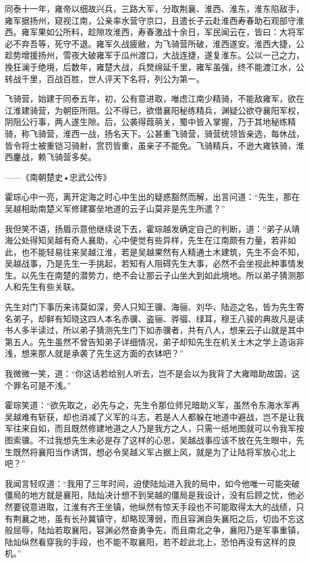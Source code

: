 同泰十一年，雍帝以细故兴兵，三路大军，分取荆襄、淮西、淮东，淮东陷敌手，雍军据扬州，窥视江南，公亲率水营守京口，且遣长子云赴淮西寿春助石观部守淮西。雍军果如公所料，趁隙攻淮西，寿春激战十余日，军民闻云在，皆曰：大将军必不弃吾等，死守不退。雍军久战疲敝，为飞骑营所破，淮西遂安。淮西大捷，公趁势增援扬州，雪夜大破雍军于瓜州渡口，大战连捷，遂复淮东。公以一己之力，挽狂澜于绝境，后数年，雍楚大战，兵燹绵延千里，雍军虽强，终不能渡江水，公转战千里，百战百胜，世人评天下名将，列公为第一。

飞骑营，始建于同泰五年，初，公有意进取，唯虑江南少精骑，不能敌雍军，欲在江淮建骑营，为朝臣所阻。公不得已，欲借襄阳秘练精兵，渊疑公欲夺襄阳军权，阴阻公行事，两人遂生隙。后，公袭得葭萌关，蜀中皆入掌握，乃于其地秘练精骑，称飞骑营，淮西一战，扬名天下。公甚重飞骑营，骑营统领皆亲选，每休战，皆令将士被重铠习骑射，赏罚皆重，虽亲子不能免。飞骑精兵，不逊大雍铁骑，淮西鏖战，赖飞骑营多矣。

——《南朝楚史•忠武公传》

霍琮心中一亮，离开定海之时心中生出的疑惑豁然而解，出言问道：“先生，那在吴越相助南楚义军修建寨垒地道的云子山莫非是先生所遣？”

我但笑不语，扬眉示意他继续说下去，霍琮越发确定自己的判断，道：“弟子从靖海公处得知吴越有奇人襄助，心中便觉有些异样，先生在江南颇有力量，若非如此，也不能轻易往来吴越江淮，若是吴越果然有人精通土木建筑，先生不会不知，吴越战事，乃是先生一手挑起，若知有人阻碍先生大事，必然不会坐视此种事情发生。以先生在南楚的潜势力，绝不会让那云子山坐大到如此境地。所以弟子猜测那人和先生有些关联。

先生对门下事历来讳莫如深，旁人只知王骥、海骊、刘华、陆迩之名，皆为先生寄名弟子，却鲜有知晓这四人本名赤骥、盗骊、骅骝、绿耳，穆王八骏的典故凡是读书人多半读过，所以弟子猜测先生门下如赤骥者，共有八人，想来云子山就是其中第五人。先生虽然不曾告知弟子详细情况，弟子却知先生在机关土木之学上造诣非浅，想来那人就是承袭了先生这方面的衣钵吧？”

我微微一笑，道：“你这话若给别人听去，岂不是会以为我背了大雍暗助故国，这个罪名可是不浅。”

霍琮笑道：“欲先取之，必先与之，先生令那位师兄暗助义军，虽然令东海水军再吴越难有斩获，却也消减了义军的斗志，若是人人都躲在地道中避战，岂不是让我军往来自如，而且既然修建地道之人乃是我方之人，只需一纸地图就可以令我军按图索骥。不过我想先生未必是存了这样的心思，吴越战事应该不放在先生眼中，先生既然将襄阳当作诱饵，想必令吴越义军占据上风，就是为了让陆将军放心北上吧？”

我闻言轻叹道：“我用了三年时间，迫使陆灿进入我的局中，如今他唯一可能突破僵局的地方就是襄阳，陆灿决计想不到吴越的僵局是我设计，没有后顾之忧，他必然要锐意进取，江淮有齐王坐镇，他纵然有惊天手段也不可能取得太大的战绩，只有荆襄之地，虽有长孙冀镇守，却略现薄弱，而且容渊自失襄阳之后，切齿不忘这般屈辱，陆灿若取襄阳，容渊必然奋勇争先，而且南北之争，襄阳乃是军事重镇，陆灿纵然看穿我的手段，也不能不取襄阳，若不趁此北上，恐怕再没有这样的良机。”

